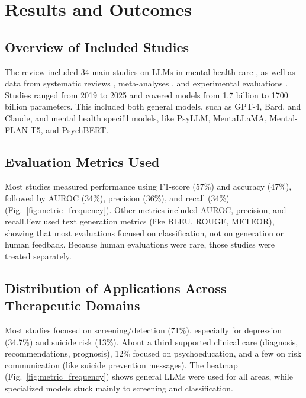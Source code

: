 \documentclass[sn-basic,authoryear]{sn-jnl}
\begin{document}
\section{Results and Outcomes}

\subsection{Overview of Included Studies}
The review included 34 main studies on LLMs in mental health care \citep{Hua2024b}, as well as data from systematic reviews \citep{JMIR2024}, meta-analyses \citep{Zhong2024}, and experimental evaluations \citep{Hodson2024, Hu2025}.
Studies ranged from 2019 to 2025 and covered models from 1.7 billion to 1700 billion parameters. This included both general models, such as GPT-4, Bard, and Claude, and mental health specifil models, like PsyLLM, MentaLLaMA, Mental-FLAN-T5, and PsychBERT.

\subsection{Evaluation Metrics Used}  
Most studies measured performance using F1-score (57\%) and accuracy (47\%), followed by AUROC (34\%), precision (36\%), and recall (34\%)   (Fig.~\ref{fig:metric_frequency}).
Other metrics included AUROC, precision, and recall.Few used text generation metrics (like BLEU, ROUGE, METEOR), showing that most evaluations focused on classification, not on generation or human feedback. Because human evaluations were rare, those studies were treated separately.

\subsection{Distribution of Applications Across Therapeutic Domains}
Most studies focused on screening/detection (71\%), especially for depression (34.7\%) and suicide risk (13\%). About a third supported clinical care (diagnosis, recommendations, prognosis), 12\% focused on psychoeducation, and a few on risk communication (like suicide prevention messages). The heatmap (Fig.~\ref{fig:metric_frequency}) shows general LLMs were used for all areas, while specialized models stuck mainly to screening and classification.
\end{document}
